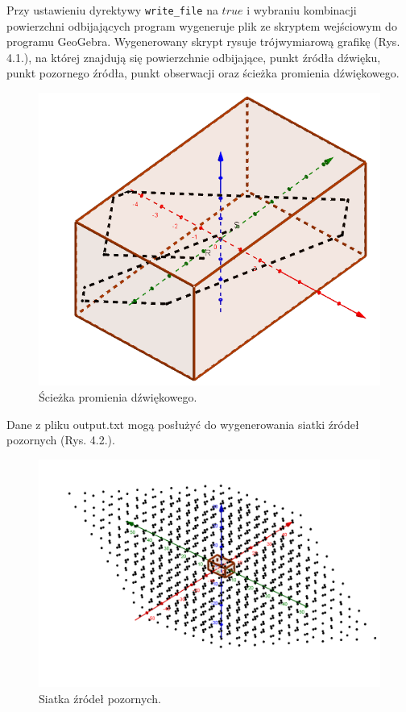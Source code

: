 Przy ustawieniu dyrektywy \verb|write_file| na $true$ i wybraniu kombinacji powierzchni odbijających program wygeneruje plik ze skryptem wejściowym do programu GeoGebra. Wygenerowany skrypt rysuje trójwymiarową grafikę (Rys. 4.1.), na której znajdują się powierzchnie odbijające, punkt źródła dźwięku, punkt pozornego źródła, punkt obserwacji oraz ścieżka promienia dźwiękowego.
\begin{figure}[h]
        \centering
                \centering
                \includegraphics[width=12cm]{rys10}
	\caption{Ścieżka promienia dźwiękowego.}
\end{figure}
Dane z pliku output.txt mogą posłużyć do wygenerowania siatki źródeł pozornych (Rys. 4.2.).
\begin{figure}[h]
        \centering
                \centering
                \includegraphics[width=12cm]{rys11}
	\caption{Siatka źródeł pozornych.}
\end{figure}













